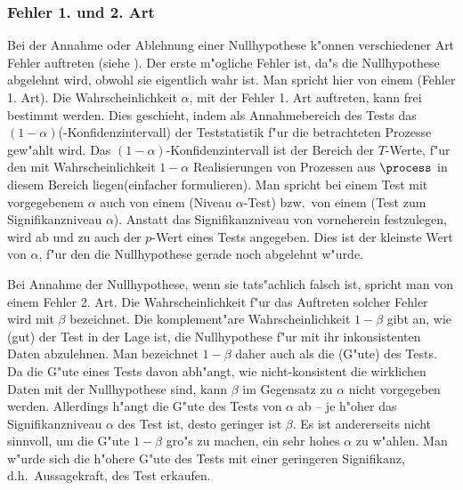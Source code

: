 \subsubsection{Fehler 1. und 2. Art}
Bei der Annahme oder Ablehnung einer Nullhypothese k"onnen verschiedener Art Fehler
auftreten (siehe ). Der
erste m"ogliche Fehler ist, da"s die Nullhypothese abgelehnt wird, obwohl sie eigentlich wahr ist.
Man spricht hier von einem \begriff(Fehler 1. Art). Die Wahrscheinlichkeit $\alpha$, mit
der Fehler 1. Art auftreten, kann frei bestimmt werden. Dies geschieht, indem als
Annahmebereich des Tests das $(1-\alpha)$\begriff(-Konfidenzintervall) der Teststatistik
f"ur die betrachteten Prozesse gew"ahlt wird. Das $(1-\alpha)$-Konfidenzintervall ist der
Bereich der $T$-Werte, f"ur den mit Wahrscheinlichkeit $1-\alpha$ Realisierungen von
Prozessen aus $\process$ in diesem Bereich liegen\korrektur(einfacher formulieren).  Man
spricht bei einem Test mit vorgegebenem $\alpha$ auch von einem \begriff(Niveau
$\alpha$-Test) bzw.\ von einem \begriff(Test zum Signifikanzniveau $\alpha$). Anstatt das
Signifikanzniveau von vorneherein festzulegen, wird ab und zu auch der $p$-Wert eines Tests
angegeben. Dies ist der kleinste Wert von $\alpha$, f"ur den die Nullhypothese gerade noch
abgelehnt w"urde.

Bei Annahme der Nullhypothese, wenn sie tats"achlich falsch ist, spricht man von einem
Fehler 2. Art.  Die Wahrscheinlichkeit f"ur das Auftreten solcher Fehler wird mit $\beta$
bezeichnet. Die komplement"are Wahrscheinlichkeit $1-\beta$ gibt an, wie \naja(gut) der
Test in der Lage ist, die Nullhypothese f"ur mit ihr inkonsistenten Daten abzulehnen. Man
bezeichnet $1-\beta$ daher auch als die \begriff(G"ute) des Tests.  Da die G"ute eines
Tests davon abh"angt, wie nicht-konsistent die wirklichen Daten mit der Nullhypothese
sind, kann $\beta$ im Gegensatz zu $\alpha$ nicht vorgegeben werden.  Allerdings h"angt
die G"ute des Tests von $\alpha$ ab -- je h"oher das Signifikanzniveau $\alpha$ des Test
ist, desto geringer ist $\beta$. Es ist andererseits nicht sinnvoll, um die G"ute
$1-\beta$ gro"s zu machen, ein sehr hohes $\alpha$ zu w"ahlen. Man w"urde sich die h"ohere
G"ute des Tests mit einer geringeren Signifikanz\footnotemark, d.h.\ Aussagekraft, des
Test erkaufen.  

